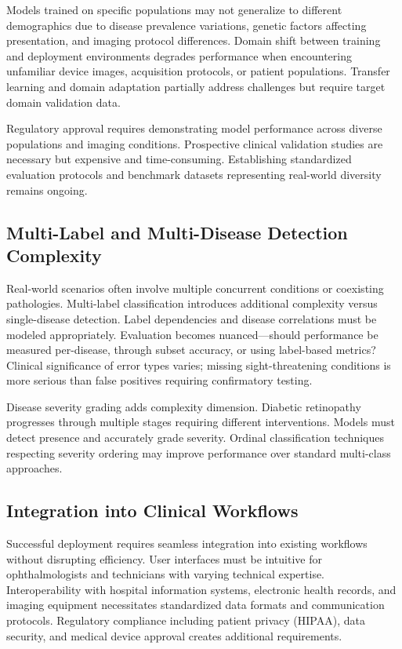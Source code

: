 Models trained on specific populations may not generalize to different demographics due to disease prevalence variations, genetic factors affecting presentation, and imaging protocol differences. Domain shift between training and deployment environments degrades performance when encountering unfamiliar device images, acquisition protocols, or patient populations. Transfer learning and domain adaptation partially address challenges but require target domain validation data.

Regulatory approval requires demonstrating model performance across diverse populations and imaging conditions. Prospective clinical validation studies are necessary but expensive and time-consuming. Establishing standardized evaluation protocols and benchmark datasets representing real-world diversity remains ongoing.

\subsection{Multi-Label and Multi-Disease Detection Complexity}

Real-world scenarios often involve multiple concurrent conditions or coexisting pathologies. Multi-label classification introduces additional complexity versus single-disease detection. Label dependencies and disease correlations must be modeled appropriately. Evaluation becomes nuanced—should performance be measured per-disease, through subset accuracy, or using label-based metrics? Clinical significance of error types varies; missing sight-threatening conditions is more serious than false positives requiring confirmatory testing.

Disease severity grading adds complexity dimension. Diabetic retinopathy progresses through multiple stages requiring different interventions. Models must detect presence and accurately grade severity. Ordinal classification techniques respecting severity ordering may improve performance over standard multi-class approaches.

\subsection{Integration into Clinical Workflows}

Successful deployment requires seamless integration into existing workflows without disrupting efficiency. User interfaces must be intuitive for ophthalmologists and technicians with varying technical expertise. Interoperability with hospital information systems, electronic health records, and imaging equipment necessitates standardized data formats and communication protocols. Regulatory compliance including patient privacy (HIPAA), data security, and medical device approval creates additional requirements.


